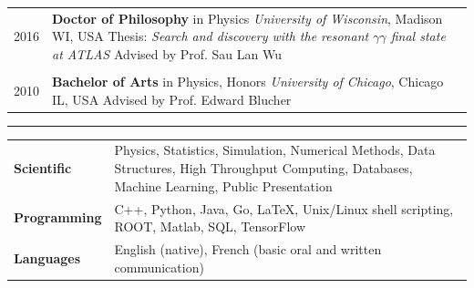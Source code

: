 \documentclass{letter}
\begin{document}
\begin{tabular}{p{}p{}}
	2016
	&
	\textbf{Doctor of Philosophy} in Physics \newline 
	\textit{University of Wisconsin}, Madison WI, USA \newline
	Thesis: \textit{Search and discovery with the resonant $\gamma\gamma$ final state at ATLAS} \newline
	Advised by Prof. Sau Lan Wu \\
\\
	2010 
	& 
	\textbf{Bachelor of Arts} in Physics, Honors \newline 
	\textit{University of Chicago}, Chicago IL, USA \newline
	Advised by Prof. Edward Blucher 
\\
\end{tabular}

\begin{flushleft}
\Large{\textsc{\textbf{\color{Maroon}{Skills}}}}
\vspace{1pt} %
\hrule
\end{flushleft}

\begin{tabular}{p{}p{}}
	{\bf Scientific} 
	&
	Physics, Statistics, Simulation, Numerical Methods, Data Structures, High Throughput Computing, Databases, Machine Learning, Public Presentation \newline
\\
	{\bf Programming} 
	&
	C++, Python, Java, Go, \LaTeX{}, Unix/Linux shell scripting, ROOT, Matlab, SQL, TensorFlow \newline
\\ 
	{\bf Languages}
	&
	English (native), French (basic oral and written communication)
\end{tabular}
\end{document}
